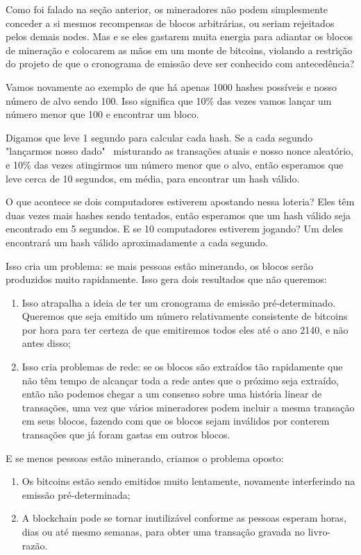 Como foi falado na seção anterior, os mineradores não podem simplesmente conceder a si mesmos recompensas de blocos arbitrárias, ou seriam rejeitados pelos demais nodes. Mas e se eles gastarem muita energia para adiantar os blocos de mineração e colocarem as mãos em um monte de bitcoins, violando a restrição do projeto de que o cronograma de emissão deve ser conhecido com antecedência?

Vamos novamente ao exemplo de que há apenas 1000 hashes possíveis e nosso número de alvo sendo 100. Isso significa que 10\% das vezes vamos lançar um número menor que 100 e encontrar um bloco.

Digamos que leve 1 segundo para calcular cada hash. Se a cada segundo "lançarmos nosso dado" \  misturando as transações atuais e nosso nonce aleatório, e 10\% das vezes atingirmos um número menor que o alvo, então esperamos que leve cerca de 10 segundos, em média, para encontrar um hash válido.

O que acontece se dois computadores estiverem apostando nessa loteria? Eles têm duas vezes mais hashes sendo tentados, então esperamos que um hash válido seja encontrado em 5 segundos. E se 10 computadores estiverem jogando? Um deles encontrará um hash válido aproximadamente a cada segundo.

Isso cria um problema: se mais pessoas estão minerando, os blocos serão produzidos muito rapidamente. Isso gera dois resultados que não queremos:

\begin{enumerate}
\item Isso atrapalha a ideia de ter um cronograma de emissão pré-determinado. Queremos que seja emitido um número relativamente consistente de bitcoins por hora para ter certeza de que emitiremos todos eles até o ano 2140, e não antes disso;
\item Isso cria problemas de rede: se os blocos são extraídos tão rapidamente que não têm tempo de alcançar toda a rede antes que o próximo seja extraído, então não podemos chegar a um consenso sobre uma história linear de transações, uma vez que vários mineradores podem incluir a mesma transação em seus blocos, fazendo com que os blocos sejam inválidos por conterem transações que já foram gastas em outros blocos.
\end{enumerate}

E se menos pessoas estão minerando, criamos o problema oposto:

\begin{enumerate}
\item Os bitcoins estão sendo emitidos muito lentamente, novamente interferindo na emissão pré-determinada;
\item A blockchain pode se tornar inutilizável conforme as pessoas esperam horas, dias ou até mesmo semanas, para obter uma transação gravada no livro-razão.
\end{enumerate}


